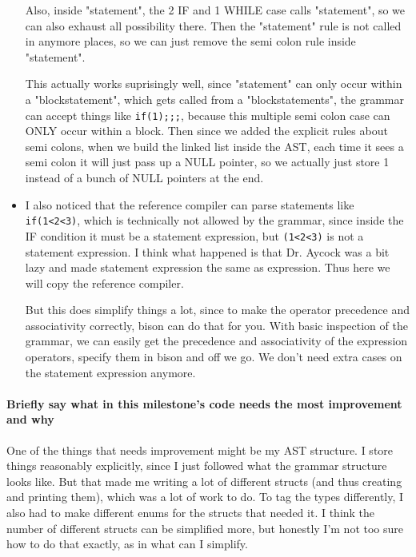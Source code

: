 \documentclass{article}
\begin{document}
\begin{itemize}
    Also, inside "statement", the 2 IF and 1 WHILE case calls "statement", so we can also exhaust all possibility there. Then the "statement" rule is not called in anymore places, so we can just remove the semi colon rule inside "statement".

    This actually works suprisingly well, since "statement" can only occur within a "blockstatement", which gets called from a "blockstatements", the grammar can accept things like \verb|if(1);;;|, because this multiple semi colon case can ONLY occur within a block. Then since we added the explicit rules about semi colons, when we build the linked list inside the AST, each time it sees a semi colon it will just pass up a NULL pointer, so we actually just store 1 instead of a bunch of NULL pointers at the end.

    \item I also noticed that the reference compiler can parse statements like \verb|if(1<2<3)|, which is technically not allowed by the grammar, since inside the IF condition it must be a statement expression, but \verb|(1<2<3)| is not a statement expression.
        I think what happened is that Dr. Aycock was a bit lazy and made statement expression the same as expression. Thus here we will copy the reference compiler.

        But this does simplify things a lot, since to make the operator precedence and associativity correctly, bison can do that for you.
        With basic inspection of the grammar, we can easily get the precedence and associativity of the expression operators, specify them in bison and off we go. We don't need extra cases on the statement expression anymore.

\end{itemize}

\paragraph{Briefly say what in this milestone's code needs the most improvement and why}
One of the things that needs improvement might be my AST structure. I store things reasonably explicitly, since I just followed what the grammar structure looks like. But that made me writing a lot of different structs (and thus creating and printing them), which was a lot of work to do. To tag the types differently, I also had to make different enums for the structs that needed it. I think the number of different structs can be simplified more, but honestly I'm not too sure how to do that exactly, as in what can I simplify.
\end{document}
